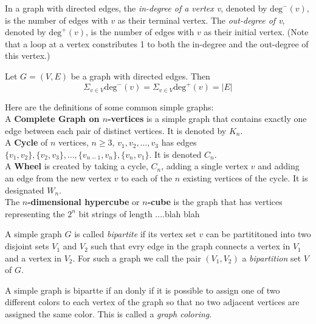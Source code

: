 \begin{definition}
In a graph with directed edges, the \textit{in-degree of a vertex v}, denoted by $\text{deg}^-(v)$, is the number of edges with $v$ as their terminal vertex. The \textit{out-degree of v}, denoted by $\text{deg}^+(v)$, is the number of edges with $v$ as their initial vertex. (Note that a loop at a vertex constributes 1 to both the in-degree and the out-degree of this vertex.)
\end{definition}

\begin{theorem}
Let $G=(V,E)$ be a graph with directed edges. Then
$$\Sigma_{v\in V} \text{deg}^-(v) = \Sigma_{v \in V} \text{deg}^+(v) = \lvert E \rvert$$
\end{theorem}

\begin{definition}Here are the definitions of some common simple graphs:\\
A \textbf{Complete Graph on $n$-vertices} is a simple graph that contains exactly one edge between each pair of distinct vertices. It is denoted by $K_n$.\\
A \textbf{Cycle} of $n$ vertices, $n\ge3$, $v_1,v_2, \dots ,v_3$ has edges $\{v_1,v_2\},\{v_2,v_3\}, \dots ,\{v_{n-1},v_n\}, \{v_n,v_1\}$. It is denoted $C_n$.\\
A \textbf{Wheel} is created by taking a cycle, $C_n$, adding a single vertex $v$ and adding an edge from the new vertex $v$ to each of the $n$ existing vertices of the cycle. It is designated $W_n$.\\
The \textbf{$n$-dimensional hypercube} or \textbf{$n$-cube} is the graph that has vertices representing the $2^n$ bit strings of length ....blah blah
\end{definition}

\begin{definition}
A simple graph $G$ is called \textit{bipartite} if its vertex set $v$ can be partititoned into two disjoint sets $V_1$ and $V_2$ such that evry edge in the graph connects a vertex in $V_1$ and a vertex in $V_2$. For such a graph we call the pair $(V_1,V_2) $ a \textit{bipartition} set $V$ of $G$.
\end {definition}

\begin{theorem}
A simple graph is bipartte if an donly if it is possible to assign one of two different colors to each vertex of the graph so that no two adjacent vertices are assigned the same color. This is called a \textit{graph coloring}.
\end{theorem}

